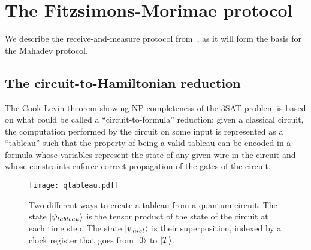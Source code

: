 \section{The Fitzsimons-Morimae protocol}
\label{sec:fm}

We describe the receive-and-measure protocol from~\cite{morimae2016post}, as it will form the basis for the Mahadev protocol. 


\subsection{The circuit-to-Hamiltonian reduction}
\label{sec:certificates-q}

The Cook-Levin theorem showing NP-completeness of the $3$SAT problem is based on what could be called a ``circuit-to-formula'' reduction: given a classical circuit, the computation performed by the circuit on some input is represented as a ``tableau'' such that the property of being a valid tableau can be encoded in a formula whose variables represent the state of any given wire in the circuit and whose constraints enforce correct propagation of the gates of the circuit. 

\begin{figure}[htb!]
\centering%
\texttt{[image: qtableau.pdf]}
\caption{Two different ways to create a tableau from a quantum circuit. The state $|\psi_{tableau}\rangle$ is the tensor product of the state of the circuit at each time step. The state $|\psi_{hist}\rangle$ is their superposition, indexed by a clock register that goes from $|0\rangle$ to $|T\rangle$.}
\label{fig:q-tableau}
\end{figure}


